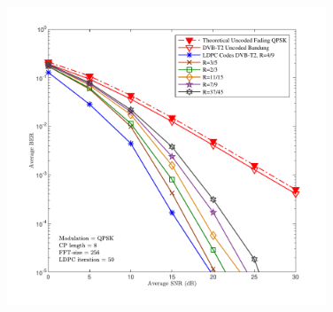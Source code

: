 
 \begin{figure}[H]
 	\centering
 	\begin{minipage}{1\linewidth}
 		\hspace{0.75 cm}
 		\includegraphics[width=0.85\textwidth]{hasilOFDMpegfix2.pdf}
 		\vspace{-1cm}
 		

\end{minipage}
\end{figure}
